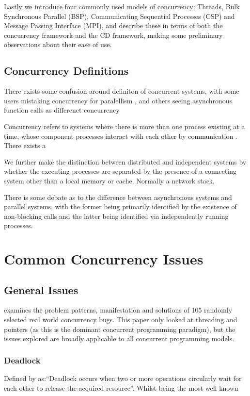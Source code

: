 \documentclass{sig-alternate}
\begin{document}
Lastly we introduce four commonly used models of concurrency: Threads, Bulk Synchronous Parallel (BSP), Communicating Sequential Processes (CSP) and Message Passing Interface (MPI), and describe these in terms of both the concurrency framework and the CD framework, making some preliminary observations about their ease of use.

\subsection{Concurrency Definitions}
There exists some confusion around definiton of concurrent systems, with some users mistaking concurrency for paralellism \cite{pike13:_concur_paral}, and others seeing asynchronous function calls as differenct concurrency

Concurrency refers to systems where there is more than one process existing at a time, whose component processes interact with each other by communication \cite{tpc}.
There exists a 

We further make the distinction between distributed and independent systems by whether the executing processes are separated by the presence of a connecting system other than a local memory or cache. Normally a network stack.

There is some debate as to the difference between asynchronous systems and parallel systems, with the former being primarily identified by the existence of non-blocking calls and the latter being identified via independently running processes.

\section{Common Concurrency Issues}
\subsection{General Issues}
\cite{shanlu08:_learn_mistak_compr_study_real} examines the problem patterns, manifestation and solutions of 105 randomly selected real world concurrency bugs. This paper only looked at threading and pointers (as this is the dominant concurrent programming paradigm), but the issues explored are broadly applicable to all concurrent programming models.

\subsubsection{Deadlock}
Defined by \cite{shanlu08:_learn_mistak_compr_study_real} as:``Deadlock occurs when two or more operations circularly wait for each other to release the acquired resource''. Whilst being the most well known 
\end{document}
